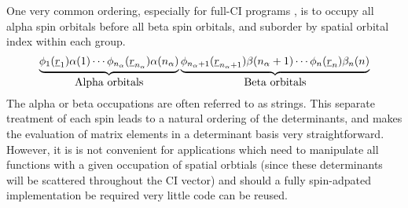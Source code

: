 One very common ordering, especially for full-CI programs
\cite{handyfci}, is to occupy all alpha spin orbitals before all beta spin
orbitals, and suborder by spatial orbital index within each group.
\begin{equation}
\underbrace{\phi_{1}(\underline{r}_{1})\alpha(1) \cdots
\phi_{n_{\alpha}}(\underline{r}_{n_{\alpha}})\alpha(n_{\alpha})}_{\mbox{Alpha orbitals}}
\underbrace{\phi_{n_{\alpha}+1}(\underline{r}_{n_{\alpha}+1})\beta(n_{\alpha}+1) \cdots 
\phi_{n}(\underline{r}_{n})\beta_{n}(n)}_{\mbox{Beta orbitals}}
\end{equation}
The alpha or beta occupations are often referred to as strings.  This
separate treatment of each spin leads to a natural ordering of the
determinants, and makes the evaluation of matrix elements in a
determinant basis very straightforward.  However, it is is not
convenient for applications which need to manipulate all functions
with a given occupation of spatial orbtials (since these determinants
will be scattered throughout the CI vector) and should a fully
spin-adpated implementation be required very little code can be
reused.  

\label{standardorder}

